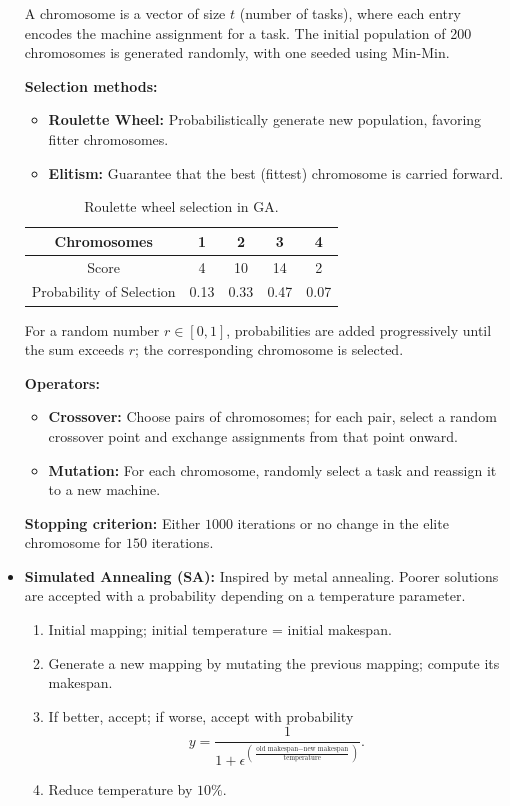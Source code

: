 \documentclass[12pt]{book}
\begin{document}
\begin{itemize}
    A chromosome is a vector of size $t$ (number of tasks), where each entry encodes the machine assignment for a task.  
    The initial population of 200 chromosomes is generated randomly, with one seeded using Min-Min.  

    \textbf{Selection methods:}
    \begin{itemize}
        \item \textbf{Roulette Wheel:} Probabilistically generate new population, favoring fitter chromosomes.
        \item \textbf{Elitism:} Guarantee that the best (fittest) chromosome is carried forward.
    \end{itemize}

    \begin{table}[H]
        \centering
        \begin{tabular}{ccccc}
            \hline
            Chromosomes & 1 & 2 & 3 & 4 \\
            \hline
            Score & 4 & 10 & 14 & 2 \\
            Probability of Selection & 0.13 & 0.33 & 0.47 & 0.07 \\
            \hline
        \end{tabular}
        \caption{Roulette wheel selection in GA.}
        \label{tab:GAroulette}
    \end{table}

    For a random number $r \in [0,1]$, probabilities are added progressively until the sum exceeds $r$; the corresponding chromosome is selected.

    \textbf{Operators:}
    \begin{itemize}
        \item \textbf{Crossover:} Choose pairs of chromosomes; for each pair, select a random crossover point and exchange assignments from that point onward.
        \item \textbf{Mutation:} For each chromosome, randomly select a task and reassign it to a new machine.
    \end{itemize}

    \textbf{Stopping criterion:} Either $1000$ iterations or no change in the elite chromosome for $150$ iterations.

    \item \textbf{Simulated Annealing (SA):}  
    Inspired by metal annealing. Poorer solutions are accepted with a probability depending on a temperature parameter.  
    \begin{enumerate}
        \item Initial mapping; initial temperature = initial makespan.
        \item Generate a new mapping by mutating the previous mapping; compute its makespan.
        \item If better, accept; if worse, accept with probability
        \[
        y = \frac{1}{1 + \epsilon^{\left(\frac{\text{old makespan} - \text{new makespan}}{\text{temperature}}\right)}}.
        \]
        \item Reduce temperature by $10\%$.
    \end{enumerate}


\end{itemize}
\end{document}
